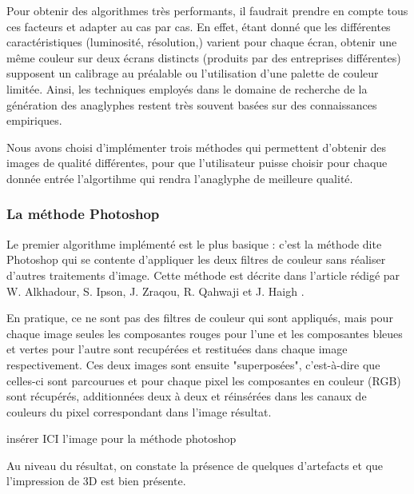 	Pour obtenir des algorithmes très performants, il faudrait prendre en compte tous ces facteurs et adapter au cas par cas. En effet, étant donné que les différentes caractéristiques (luminosité, résolution,) varient pour chaque écran, obtenir une même couleur sur deux écrans distincts (produits par des entreprises différentes) supposent un calibrage au préalable ou l'utilisation d'une palette de couleur limitée. Ainsi, les techniques employés dans le domaine de recherche de la génération des anaglyphes restent très souvent basées sur des connaissances empiriques.
		
	Nous avons choisi d'implémenter trois méthodes qui permettent d'obtenir des images de qualité différentes, pour que l'utilisateur puisse choisir pour chaque donnée entrée l'algortihme qui rendra l'anaglyphe de meilleure qualité. %
	  
\subsubsection{La méthode Photoshop}
	Le premier algorithme implémenté est le plus basique : c'est la méthode dite Photoshop qui se contente d'appliquer les deux filtres de couleur sans réaliser d'autres traitements d'image. Cette méthode est décrite dans l'article rédigé par W. Alkhadour, S. Ipson, J. Zraqou, R. Qahwaji et J. Haigh \cite{steteroAnaglyph}.
		
	En pratique, ce ne sont pas des filtres de couleur qui sont appliqués, mais pour chaque image seules les composantes rouges pour l'une et les composantes bleues et vertes pour l'autre sont recupérées et restituées dans chaque image respectivement. Ces deux images sont ensuite "superposées", c'est-à-dire que celles-ci sont parcourues et pour chaque pixel les composantes en couleur (RGB) sont récupérés, additionnées deux à deux et réinsérées dans les canaux de couleurs du pixel correspondant dans l'image résultat. %
	
	 insérer ICI l'image pour la méthode photoshop

	Au niveau du résultat, on constate la présence de quelques d'artefacts et que l'impression de 3D est bien présente.
